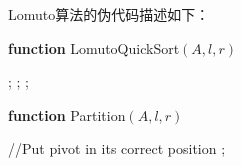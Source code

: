 		Lomuto算法的伪代码描述如下：
	
\begin{algorithm}[H]
\caption{{\sc LomutoQuickSort} algorithm}\label{LomutoQuickSortAlgo} 
{\bf function} {\sc LomutoQuickSort}$(A, l, r)$ 
\begin{algorithmic}[1]
	; 
	; 
	;
\ENDIF
\end{algorithmic}
\end{algorithm}

\begin{algorithm}[H]
\caption{{\sc Partition} algorithm used by {\sc LomutoQuickSort} }\label{LomutoPartitionAlgo} 
{\bf function} {\sc Partition}$(A, l, r)$ 
\begin{algorithmic}[1]
	\ENDIF
\ENDFOR
{} //Put pivot in its correct position
;
\end{algorithmic}
\end{algorithm}


